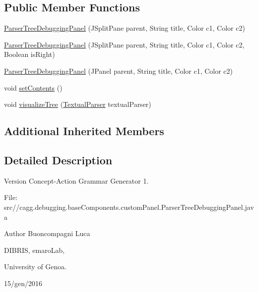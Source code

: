 \subsection*{Public Member Functions}
\begin{DoxyCompactItemize}
\item 
\hyperlink{classit_1_1emarolab_1_1cagg_1_1debugging_1_1baseComponents_1_1customPanel_1_1ParserTreeDebuggingPanel_ad2aa0244a32f683b71926f703b53a3f4}{Parser\-Tree\-Debugging\-Panel} (J\-Split\-Pane parent, String title, Color c1, Color c2)
\item 
\hyperlink{classit_1_1emarolab_1_1cagg_1_1debugging_1_1baseComponents_1_1customPanel_1_1ParserTreeDebuggingPanel_a1b93bec422967132a22968ec6cccd516}{Parser\-Tree\-Debugging\-Panel} (J\-Split\-Pane parent, String title, Color c1, Color c2, Boolean is\-Right)
\item 
\hyperlink{classit_1_1emarolab_1_1cagg_1_1debugging_1_1baseComponents_1_1customPanel_1_1ParserTreeDebuggingPanel_a2b0af6fc7c65c01e4f152d1e1a5b0619}{Parser\-Tree\-Debugging\-Panel} (J\-Panel parent, String title, Color c1, Color c2)
\item 
void \hyperlink{classit_1_1emarolab_1_1cagg_1_1debugging_1_1baseComponents_1_1customPanel_1_1ParserTreeDebuggingPanel_a124d1c6378873a77e211877cfe5444d4}{set\-Contents} ()
\item 
void \hyperlink{classit_1_1emarolab_1_1cagg_1_1debugging_1_1baseComponents_1_1customPanel_1_1ParserTreeDebuggingPanel_a91351b7f37b7eabee636eca1656d7e33}{visualize\-Tree} (\hyperlink{classit_1_1emarolab_1_1cagg_1_1core_1_1language_1_1parser_1_1TextualParser}{Textual\-Parser} textual\-Parser)
\end{DoxyCompactItemize}
\subsection*{Additional Inherited Members}


\subsection{Detailed Description}
\begin{DoxyVersion}{Version}
Concept-\/\-Action Grammar Generator 1. \par
 File\-: src//cagg.debugging.\-base\-Components.\-custom\-Panel.\-Parser\-Tree\-Debugging\-Panel.\-java \par

\end{DoxyVersion}
\begin{DoxyAuthor}{Author}
Buoncompagni Luca \par
 D\-I\-B\-R\-I\-S, emaro\-Lab,\par
 University of Genoa. \par
 15/gen/2016 \par

\end{DoxyAuthor}



